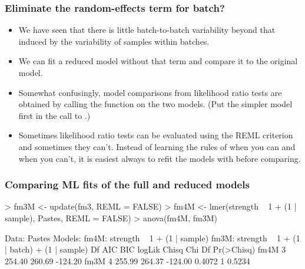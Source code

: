 \begin{frame}
\frametitle{Eliminate the random-effects term for batch?}
\begin{itemize}
\item We have seen that there is little batch-to-batch variability
  beyond that induced by the variability of samples within batches.
\item We can fit a reduced model without that term and compare it to
  the original model.
\item Somewhat confusingly, model comparisons from likelihood ratio
  tests are obtained by calling the  function on the two
  models.  (Put the simpler model first in the call to .)
\item Sometimes likelihood ratio tests can be evaluated using the REML
  criterion and sometimes they can't.  Instead of learning the rules
  of when you can and when you can't, it is easiest always to refit the
  models with  before comparing.
\end{itemize}
\end{frame}

\begin{frame}[fragile]
  \frametitle{Comparing ML fits of the full and reduced models}
\begin{Schunk}
\begin{Sinput}
> fm3M <- update(fm3, REML = FALSE)
> fm4M <- lmer(strength ~ 1 + (1 | sample), Pastes, REML = FALSE)
> anova(fm4M, fm3M)
\end{Sinput}
\begin{Soutput}
Data: Pastes
Models:
fm4M: strength ~ 1 + (1 | sample)
fm3M: strength ~ 1 + (1 | batch) + (1 | sample)
     Df     AIC     BIC  logLik  Chisq Chi Df Pr(>Chisq)
fm4M  3  254.40  260.69 -124.20                         
fm3M  4  255.99  264.37 -124.00 0.4072      1     0.5234
\end{Soutput}
\end{Schunk}
\end{frame}

